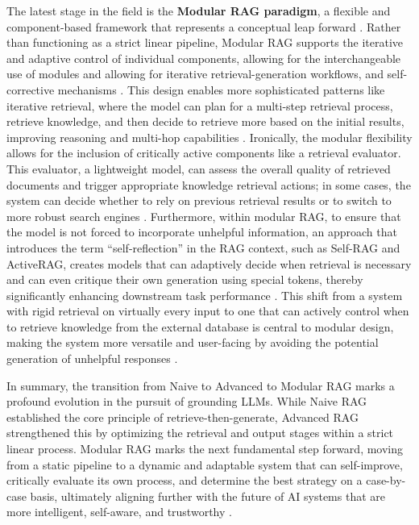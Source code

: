 \documentclass[11pt]{article}
\begin{document}
The latest stage in the field is the \textbf{Modular RAG paradigm}, a flexible and component-based framework that represents a conceptual leap forward \cite{ref23}. Rather than functioning as a strict linear pipeline, Modular RAG supports the iterative and adaptive control of individual components, allowing for the interchangeable use of modules and allowing for iterative retrieval-generation workflows, and self-corrective mechanisms \cite{ref23}. This design enables more sophisticated patterns like iterative retrieval, where the model can plan for a multi-step retrieval process, retrieve knowledge, and then decide to retrieve more based on the initial results, improving reasoning and multi-hop capabilities \cite{ref23}. Ironically, the modular flexibility allows for the inclusion of critically active components like a retrieval evaluator. This evaluator, a lightweight model, can assess the overall quality of retrieved documents and trigger appropriate knowledge retrieval actions; in some cases, the system can decide whether to rely on previous retrieval results or to switch to more robust search engines \cite{ref40}. Furthermore, within modular RAG, to ensure that the model is not forced to incorporate unhelpful information, an approach that introduces the term ``self-reflection'' in the RAG context, such as Self-RAG and ActiveRAG, creates models that can adaptively decide when retrieval is necessary and can even critique their own generation using special tokens, thereby significantly enhancing downstream task performance \cite{ref41,ref36}. This shift from a system with rigid retrieval on virtually every input to one that can actively control when to retrieve knowledge from the external database is central to modular design, making the system more versatile and user-facing by avoiding the potential generation of unhelpful responses \cite{ref41,ref23}.

In summary, the transition from Naive to Advanced to Modular RAG marks a profound evolution in the pursuit of grounding LLMs. While Naive RAG established the core principle of retrieve-then-generate, Advanced RAG strengthened this by optimizing the retrieval and output stages within a strict linear process. Modular RAG marks the next fundamental step forward, moving from a static pipeline to a dynamic and adaptable system that can self-improve, critically evaluate its own process, and determine the best strategy on a case-by-case basis, ultimately aligning further with the future of AI systems that are more intelligent, self-aware, and trustworthy \cite{ref23}.
\end{document}
